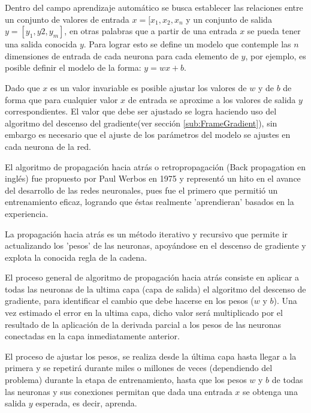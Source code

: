         Dentro del campo aprendizaje automático se busca establecer las relaciones entre un conjunto de valores de entrada $x = [x_1, x_2, x_n$ y un conjunto de salida $y = [y_1, y2, y_m]$, en otras palabras que a partir de una entrada $x$ se pueda tener una salida conocida $y$. Para lograr esto se define un modelo que contemple las $n$ dimensiones de entrada de cada neurona para cada elemento de $y$, por ejemplo, es posible definir el modelo de la forma: $y=wx+b$.
        
        Dado que $x$ es un valor invariable es posible ajustar los valores de $w$ y de $b$ de forma que para cualquier valor $x$ de entrada se aproxime a los valores de salida $y$ correspondientes. El valor que debe ser ajustado se logra haciendo uso del algoritmo del descenso del gradiente(ver sección \ref{sub:FrameGradient}), sin embargo es necesario que el ajuste de los parámetros del modelo se ajustes en cada neurona de la red.
    
        El algoritmo de propagación hacia atrás o retropropagación (Back propagation en inglés) fue propuesto por Paul Werbos \cite{Werbos1975} en 1975 y representó un hito en el avance del desarrollo de las redes neuronales, pues fue el primero que permitió un entrenamiento eficaz, logrando que éstas realmente 'aprendieran' basados en la experiencia.
        
        La propagación hacia atrás es un método iterativo y recursivo que permite ir actualizando los 'pesos' de las neuronas, apoyándose en el descenso de gradiente y explota la conocida regla de la cadena.
    
        El proceso general de algoritmo de propagación hacia atrás consiste en aplicar a todas las neuronas de la ultima capa (capa de salida) el algoritmo del descenso de gradiente, para identificar el cambio que debe hacerse en los pesos ($w$ y $b$). Una vez estimado el error en la ultima capa, dicho valor será multiplicado por el resultado de la aplicación de la derivada parcial a los pesos de las neuronas conectadas en la capa inmediatamente anterior.
        
        El proceso de ajustar los pesos, se realiza desde la última capa hasta llegar a la primera y se repetirá durante miles o millones de veces (dependiendo del problema) durante la etapa de entrenamiento, hasta que los pesos $w$ y $b$ de todas las neuronas y sus conexiones permitan que dada una entrada $x$ se obtenga una salida $y$ esperada, es decir, aprenda.
        
